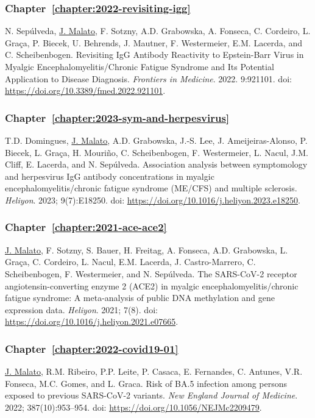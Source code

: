 \subsubsection{Chapter~\ref{chapter:2022-revisiting-igg}}
\vspace{-1em}
\noindent N. Sepúlveda, \underline{J. Malato}, F. Sotzny, A.D. Grabowska, A. Fonseca, C. Cordeiro, L. Graça, P. Biecek, U. Behrends, J. Mautner, F. Westermeier, E.M. Lacerda, and C. Scheibenbogen. Revisiting IgG Antibody Reactivity to Epstein-Barr Virus in Myalgic Encephalomyelitis/Chronic Fatigue Syndrome and Its Potential Application to Disease Diagnosis. \textit{Frontiers in Medicine}. 2022. 9:921101. doi: \url{https://doi.org/10.3389/fmed.2022.921101}.

\subsubsection{Chapter~\ref{chapter:2023-sym-and-herpesvirus}}
\vspace{-1em}
\noindent T.D. Domingues, \underline{J. Malato}, A.D. Grabowska, J.-S. Lee, J. Ameijeiras-Alonso, P. Biecek, L. Graça, H. Mouriño, C. Scheibenbogen, F. Westermeier, L. Nacul, J.M. Cliff, E. Lacerda, and N. Sepúlveda. Association analysis between symptomology and herpesvirus IgG antibody concentrations in myalgic encephalomyelitis/chronic fatigue syndrome (ME/CFS) and multiple sclerosis. \textit{Heliyon}. 2023; 9(7):E18250. doi: \url{https://doi.org/10.1016/j.heliyon.2023.e18250}.

\subsubsection{Chapter~\ref{chapter:2021-ace-ace2}}
\vspace{-1em}
\noindent\underline{J. Malato}, F. Sotzny, S. Bauer, H. Freitag, A. Fonseca, A.D. Grabowska, L. Graça, C. Cordeiro, L. Nacul, E.M. Lacerda, J. Castro-Marrero, C. Scheibenbogen, F. Westermeier, and N. Sepúlveda. The SARS-CoV-2 receptor angiotensin-converting enzyme 2 (ACE2) in myalgic encephalomyelitis/chronic fatigue syndrome: A meta-analysis of public DNA methylation and gene expression data. \textit{Heliyon}. 2021; 7(8). doi: \url{https://doi.org/10.1016/j.heliyon.2021.e07665}.

\subsubsection{Chapter~\ref{chapter:2022-covid19-01}}
\vspace{-1em}
\noindent\underline{J. Malato}, R.M. Ribeiro, P.P. Leite, P. Casaca, E. Fernandes, C. Antunes, V.R. Fonseca, M.C. Gomes, and L. Graca. Risk of BA.5 infection among persons exposed to previous SARS-CoV-2 variants. \textit{New England Journal of Medicine}. 2022; 387(10):953--954. doi: \url{https://doi.org/10.1056/NEJMc2209479}.


